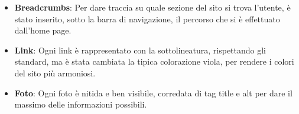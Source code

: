 \begin{itemize}
    \item \textbf{Breadcrumbs}: Per dare traccia su quale sezione del sito si trova l'utente, \`e stato inserito, sotto la barra di navigazione, il percorso che si \`e effettuato dall'home page.

    \item \textbf{Link}: Ogni link \`e rappresentato con la sottolineatura, rispettando gli standard, ma \`e stata cambiata la tipica colorazione viola, per rendere i colori del sito pi\`u armoniosi.

    \item \textbf{Foto}: Ogni foto \`e nitida e ben visibile, corredata di tag title e alt per dare il massimo delle informazioni possibili.

\end{itemize}
